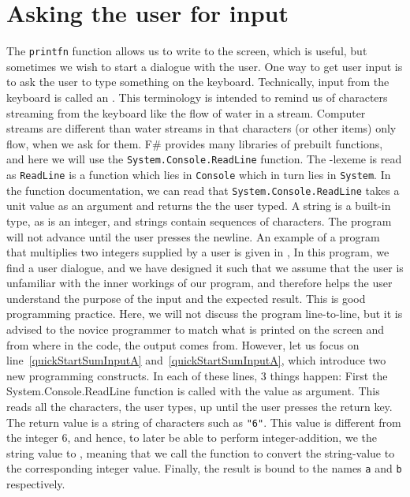\documentclass[fsharpNotes.tex]{subfiles}
\begin{document}
\section{Asking the user for input}
The \lstinline{printfn} function allows us to write to the screen, which is useful, but sometimes we wish to start a dialogue with the user. One way to get user input is to ask the user to type something on the keyboard. Technically, input from the keyboard is called an  . This terminology is intended to remind us of characters streaming from the keyboard like the flow of water in a stream. Computer streams are different than water streams in that characters (or other items) only flow, when we ask for them. F\# provides many libraries of prebuilt functions, and here we will use the \lstinline{System.Console.ReadLine} function. The -lexeme is read as \lstinline{ReadLine} is a function which lies in \lstinline{Console} which in turn lies in \lstinline{System}. In the function documentation, we can read that \lstinline{System.Console.ReadLine} takes a unit value as an argument and returns the  the user typed. A string is a built-in type, as is an integer, and strings contain sequences of characters. The program will not advance until the user presses the newline. An example of a program that multiplies two integers supplied by a user is given in ,
% 
%
In this program, we find a user dialogue, and we have designed it such that we assume that the user is unfamiliar with the inner workings of our program, and therefore helps the user understand the purpose of the input and the expected result. This is good programming practice. Here, we will not discuss the program line-to-line, but it is advised to the novice programmer to match what is printed on the screen and from where in the code, the output comes from. However, let us focus on line~\ref{quickStartSumInputA} and~\ref{quickStartSumInputA}, which introduce two new programming constructs. In each of these lines, 3 things happen: First the System.Console.ReadLine function is called with the \lexeme{()} value as argument. This reads all the characters, the user types, up until the user presses the return key. The return value is a string of characters such as \lstinline{"6"}. This value is different from the integer 6, and hence, to later be able to perform integer-addition, we  the string value to , meaning that we call the function  to convert the string-value to the corresponding integer value. Finally, the result is bound to the names \lstinline{a} and \lstinline{b} respectively.
\end{document}
